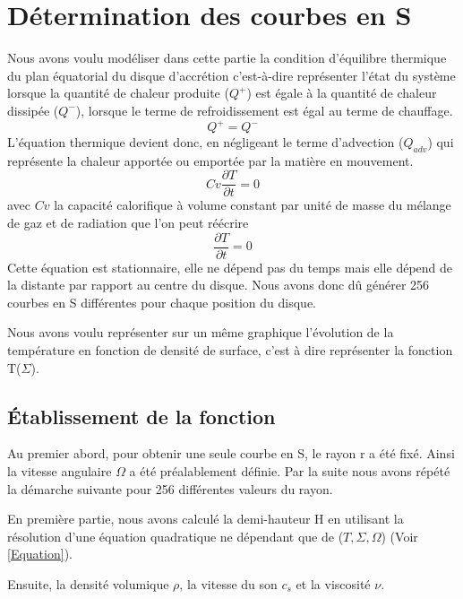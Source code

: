 \section{Détermination des courbes en S}

Nous avons voulu modéliser dans cette partie la condition d'équilibre thermique du plan équatorial du disque d'accrétion c'est-à-dire représenter l'état du système lorsque la quantité de chaleur produite ($Q^+$) est égale à la quantité de chaleur dissipée ($Q^-$), lorsque le terme de refroidissement est égal au terme de chauffage.
\begin{equation}
Q^+ = Q^-
\end{equation}
L'équation thermique devient donc, en négligeant le terme d'advection ($Q_{adv}$) qui représente la chaleur apportée ou emportée par la matière en mouvement.
\begin{equation}
Cv\frac{\partial T}{\partial t} = 0
\end{equation}
avec $Cv$ la capacité calorifique à volume constant par unité de masse du mélange de gaz et de radiation que l'on peut réécrire
\begin{equation}
\frac{\partial T}{\partial t} = 0
\end{equation}
Cette équation est stationnaire, elle ne dépend pas du temps mais elle dépend de la distante par rapport au centre du disque. Nous avons donc dû générer 256 courbes en S différentes pour chaque position du disque.

Nous avons voulu représenter sur un même graphique l'évolution de la température en fonction de densité de surface, c'est à dire représenter la fonction T($\Sigma$).
   

\subsection{Établissement de la fonction}

Au premier abord, pour obtenir une seule courbe en S, le rayon r a été fixé. Ainsi la vitesse angulaire $\Omega$ a été préalablement définie. Par la suite nous avons répété la démarche suivante pour 256 différentes valeurs du rayon.

En première partie, nous avons calculé la demi-hauteur H en utilisant la résolution d'une équation quadratique ne dépendant que de ($T,\Sigma,\Omega$) (Voir \ref{Equation}).

Ensuite, la densité volumique $\rho$, la vitesse du son $c_s$ et la viscosité $\nu$. 

